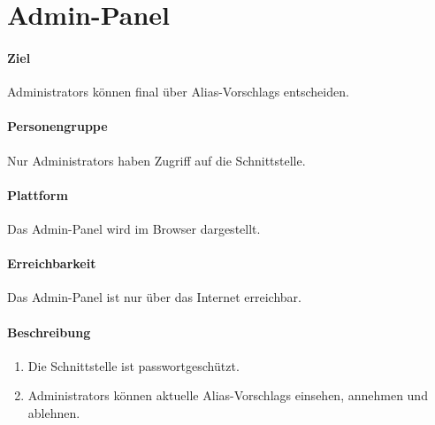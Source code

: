 \section{Admin-Panel}
\label{Admin-Panel}
\paragraph{Ziel}
\Glspl{Administrator} können final über \Glspl{Alias-Vorschlag} entscheiden.
\paragraph{Personengruppe}
Nur \Glspl{Administrator} haben Zugriff auf die \Gls{Schnittstelle}.
\paragraph{Plattform}
Das \Gls{Admin-Panel} wird im \Gls{Browser} dargestellt.
\paragraph{Erreichbarkeit}
Das \Gls{Admin-Panel} ist nur über das Internet erreichbar. 

\paragraph{Beschreibung}
\begin{enumerate}
    \item Die \Gls{Schnittstelle} ist passwortgeschützt.
    \item \Glspl{Administrator} können aktuelle \Glspl{Alias-Vorschlag} einsehen, annehmen und ablehnen.
\end{enumerate}